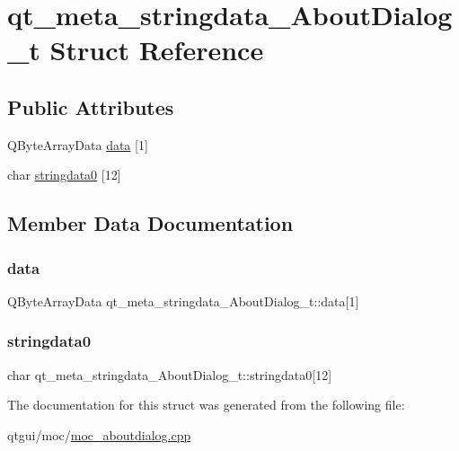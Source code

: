 \hypertarget{structqt__meta__stringdata___about_dialog__t}{}\section{qt\+\_\+meta\+\_\+stringdata\+\_\+\+About\+Dialog\+\_\+t Struct Reference}
\label{structqt__meta__stringdata___about_dialog__t}
\subsection*{Public Attributes}
\begin{DoxyCompactItemize}
\item 
Q\+Byte\+Array\+Data \mbox{\hyperlink{structqt__meta__stringdata___about_dialog__t_ada8f4749727b87f47436bd9a52be606f}{data}} \mbox{[}1\mbox{]}
\item 
char \mbox{\hyperlink{structqt__meta__stringdata___about_dialog__t_ab01d37b84ce81fea50efc844e9593911}{stringdata0}} \mbox{[}12\mbox{]}
\end{DoxyCompactItemize}


\subsection{Member Data Documentation}
\mbox{\label{structqt__meta__stringdata___about_dialog__t_ada8f4749727b87f47436bd9a52be606f}} 
\subsubsection{\texorpdfstring{data}{data}}
{\footnotesize\ttfamily Q\+Byte\+Array\+Data qt\+\_\+meta\+\_\+stringdata\+\_\+\+About\+Dialog\+\_\+t\+::data\mbox{[}1\mbox{]}}

\mbox{\label{structqt__meta__stringdata___about_dialog__t_ab01d37b84ce81fea50efc844e9593911}} 
\subsubsection{\texorpdfstring{stringdata0}{stringdata0}}
{\footnotesize\ttfamily char qt\+\_\+meta\+\_\+stringdata\+\_\+\+About\+Dialog\+\_\+t\+::stringdata0\mbox{[}12\mbox{]}}



The documentation for this struct was generated from the following file\+:\begin{DoxyCompactItemize}
\item 
qtgui/moc/\mbox{\hyperlink{moc__aboutdialog_8cpp}{moc\+\_\+aboutdialog.\+cpp}}\end{DoxyCompactItemize}
